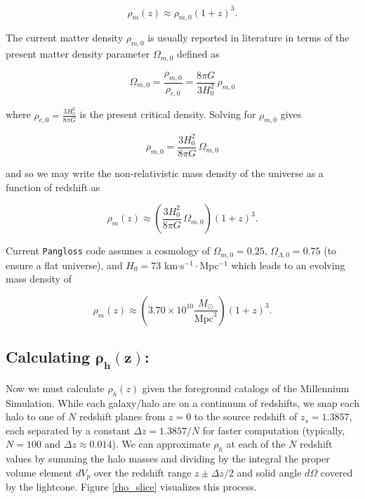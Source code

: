 \documentclass[12pt]{article}
\begin{document}
\begin{equation}\label{mass_evol}
\rho_m(z)\approx\rho_{m,0}(1+z)^3.
\end{equation}

The current matter density $\rho_{m,0}$ is usually reported in literature in terms of the present matter density parameter $\Omega_{m,0}$ defined as

\begin{equation}\label{}
\Omega_{m,0}=\frac{\rho_{m,0}}{\rho_{c,0}}=\frac{8\pi G}{3H_0^2}\,\rho_{m,0}
\end{equation}

where $\rho_{c,0}=\frac{3H_0^2}{8\pi G}$ is the present critical density. Solving for $\rho_{m,0}$ gives

\begin{equation*}\label{}
\rho_{m,0}=\frac{3H_0^2}{8\pi G}\,\Omega_{m,0}
\end{equation*}

and so we may write the non-relativistic mass density of the universe as a function of redshift as

\begin{equation}\label{rho}
\rho_m(z)\approx\left(\frac{3H_0^2}{8\pi G}\,\Omega_{m,0}\right)(1+z)^3.
\end{equation}

Current \texttt{Pangloss} code assumes a cosmology of $\Omega_{m,0}=0.25$, $\Omega_{\Lambda,0}=0.75$ (to ensure a flat universe), and $H_0=73$ km$\cdot$s$^{-1}\cdot$Mpc$^{-1}$ which leads to an evolving mass density of

\begin{equation}\label{rho}
\rho_m(z)\approx\left(3.70\times10^{10}\frac{M_{\odot}}{\text{Mpc}^3}\right)(1+z)^3.
\end{equation}

\subsection*{Calculating $\bm{\rho_h(z)}$:}

Now we must calculate $\rho_h(z)$ given the foreground catalogs of the Millennium Simulation. While each galaxy/halo are on a continuum of redshifts, we snap each halo to one of $N$ redshift planes from $z=0$ to the source redshift of $z_s=1.3857$, each separated by a constant $\Delta z=1.3857/N$ for faster computation (typically, $N=100$ and $\Delta z\approx0.014$). We can approximate $\rho_h$ at each of the $N$ redshift values by summing the halo masses and dividing by the integral the proper volume element $dV_p$ over the redshift range $z\pm \Delta z/2$ and solid angle $d\Omega$ covered by the lightcone. Figure \ref{rho_slice} visualizes this process.\\
\end{document}
